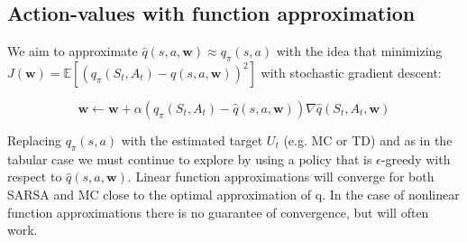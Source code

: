 \subsection*{Action-values with function approximation}
We aim to approximate $\hat{q}(s,a,\textbf{w}) \approx q_\pi(s,a)$ with the idea that minimizing $J(\textbf{w}) = \mathbb{E} [(q_\pi(S_t,A_t) - \hat{q}(s,a,\textbf{w}))^{2}]$ with stochastic gradient descent:

	\begin{equation}
	 	\textbf{w} \leftarrow \textbf{w} + \alpha (q_\pi(S_t,A_t) - \hat{q}(s,a,\textbf{w})) \nabla \hat{q}(S_t,A_t,\textbf{w})
	 \end{equation} 

Replacing $q_\pi(s,a)$ with the estimated target $U_t$ (e.g. MC or TD) and as in the tabular case we must continue to explore by using a policy that is $\epsilon$-greedy with respect to $\hat{q}(s,a,\textbf{w})$. Linear function approximations will converge for both SARSA and MC close to the optimal approximation of q. In the case of nonlinear function approximations there is no guarantee of convergence, but will often work.

